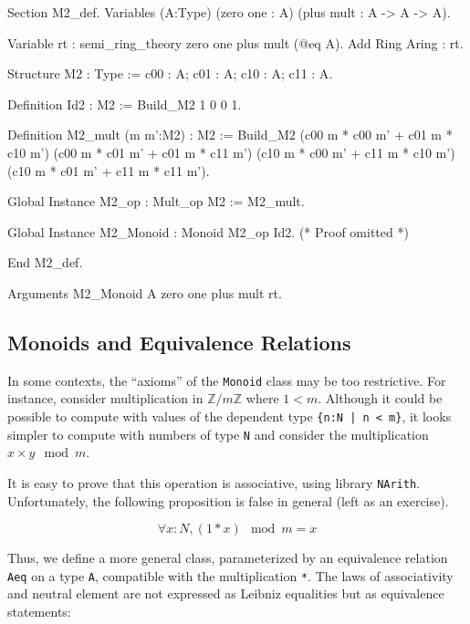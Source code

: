 \begin{Coqsrc}
Section M2_def.
Variables (A:Type)
           (zero one : A) 
           (plus mult  : A -> A -> A).

 Variable rt : semi_ring_theory  zero one plus mult  (@eq A).
 Add  Ring Aring : rt.
\end{Coqsrc}

\begin{Coqsrc}
Structure M2 : Type := {c00 : A;  c01 : A;
                        c10 : A;  c11 : A}.

Definition Id2 : M2 := Build_M2 1 0 0 1.

Definition M2_mult (m m':M2) : M2 :=
 Build_M2 
          (c00 m * c00 m' + c01 m * c10 m')
          (c00 m * c01 m' + c01 m * c11 m')
          (c10 m * c00 m' + c11 m * c10 m')
          (c10 m * c01 m' + c11 m * c11 m').

Global Instance M2_op : Mult_op M2 := M2_mult.
\end{Coqsrc}

\begin{Coqsrc}
Global Instance M2_Monoid : Monoid   M2_op Id2.
(* Proof omitted *)

End M2_def.

Arguments M2_Monoid {A zero one plus mult} rt.
\end{Coqsrc}


\subsection{Monoids and Equivalence Relations}

In some contexts, the ``axioms'' of the \texttt{Monoid} class  may be too restrictive.
For instance, consider multiplication in $\mathds{Z}/m\mathds{Z}$ where
 $1<m$.
Although it could be possible to compute with values of the dependent 
type \texttt{\{n:N | n < m\}}, 
it looks simpler to compute with numbers of type
\texttt{N} and consider the multiplication $x \times y \mod{m}$.



It is easy to prove that this operation is associative, using library \texttt{NArith}. Unfortunately, the following proposition is false in general (left as an exercise).

$$\forall x:N, (1 * x) \mod{m} = x$$


Thus, we define a more general class, parameterized by an equivalence
relation \texttt{Aeq}  on a type \texttt{A}, compatible with the multiplication \texttt{*}. The laws of associativity and neutral element
are not expressed as Leibniz equalities but as equivalence statements:

